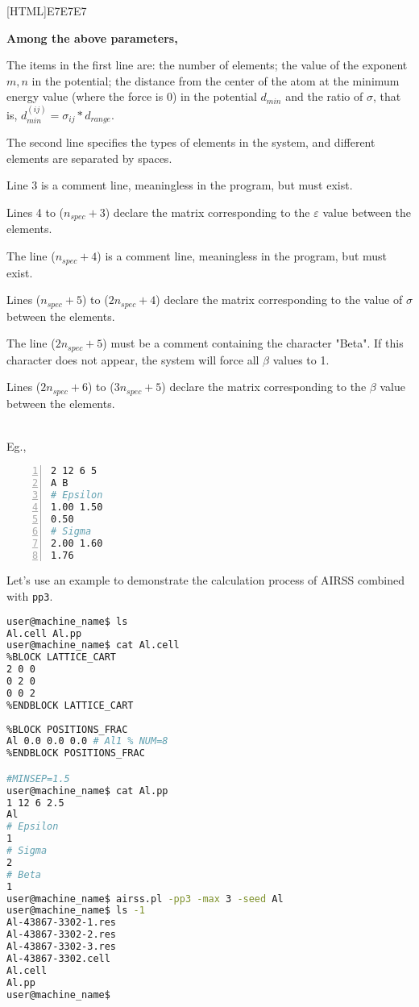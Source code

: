 \documentclass[a4paper, 10pt]{article}
\begin{document}
\noindent{}[HTML]{E7E7E7}{\parbox{\textwidth}{%
\noindent \textbf{Among the above parameters,}
\begin{maineu}
  \item The items in the first line are: the number of elements; the value of the exponent \(m,n\) in the potential; the distance from the center of the atom at the minimum energy value (where the force is 0) in the potential \(d_{min}\) and the ratio of \(\sigma\), that is, \(d_{min}^{(ij)} = \sigma_{ij}*d_{range}\).
  \item The second line specifies the types of elements in the system, and different elements are separated by spaces.
  \item Line 3 is a comment line, meaningless in the program, but must exist.
  \item Lines 4 to (\(n_{spec}+3\)) declare the matrix corresponding to the \(\varepsilon\) value between the elements.
  \item The line (\(n_{spec}+4\)) is a comment line, meaningless in the program, but must exist.
  \item Lines (\(n_{spec}+5\)) to (\(2n_{spec}+4\)) declare the matrix corresponding to the value of \(\sigma\) between the elements.
  \item The line (\(2n_{spec}+5\)) must be a comment containing the character "Beta". If this character does not appear, the system will force all \(\beta\) values to 1.
  \item Lines (\(2n_{spec}+6\)) to (\(3n_{spec}+5\)) declare the matrix corresponding to the \(\beta\) value between the elements.
\end{maineu}}}\\

Eg.,
\begin{lstlisting}[language={bash},numbers=left]
2 12 6 5
A B
# Epsilon
1.00 1.50
0.50
# Sigma
2.00 1.60
1.76
\end{lstlisting}

Let's use an example to demonstrate the calculation process of AIRSS combined with \verb|pp3|.
\begin{lstlisting}[language={bash}]
user@machine_name$ ls 
Al.cell Al.pp
user@machine_name$ cat Al.cell
%BLOCK LATTICE_CART
2 0 0
0 2 0
0 0 2 
%ENDBLOCK LATTICE_CART
 
%BLOCK POSITIONS_FRAC
Al 0.0 0.0 0.0 # Al1 % NUM=8
%ENDBLOCK POSITIONS_FRAC

#MINSEP=1.5
user@machine_name$ cat Al.pp
1 12 6 2.5
Al
# Epsilon
1
# Sigma
2
# Beta
1
user@machine_name$ airss.pl -pp3 -max 3 -seed Al
user@machine_name$ ls -1
Al-43867-3302-1.res
Al-43867-3302-2.res
Al-43867-3302-3.res
Al-43867-3302.cell
Al.cell
Al.pp
user@machine_name$
\end{lstlisting}
\end{document}
